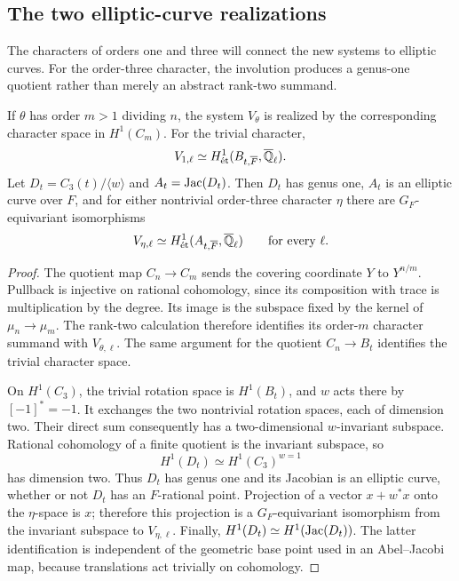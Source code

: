 \subsection{The two elliptic-curve realizations}

The characters of orders one and three will connect the new systems
to elliptic curves.  For the order-three character, the involution
produces a genus-one quotient rather than merely an abstract
rank-two summand.

\begin{proposition}\label{sys:elliptic}
If $\theta$ has order $m>1$ dividing $n$, the system $V_\theta$ is
realized by the corresponding character space in $H^1(C_m)$.
For the trivial character,
\[
 V_{1,\ell}\simeq H^1_{\mathrm{\acute et}}
                  (B_{t,\overline F},\overline{\mathbb Q}_\ell).
\]
Let $D_t=C_3(t)/\langle w\rangle$ and $A_t=\operatorname{Jac}(D_t)$.  Then $D_t$
has genus one, $A_t$ is an elliptic curve over $F$, and for either
nontrivial order-three character $\eta$ there are $G_F$-equivariant
isomorphisms
\[
 V_{\eta,\ell}\simeq
 H^1_{\mathrm{\acute et}}(A_{t,\overline F},\overline{\mathbb Q}_\ell)
 \qquad\text{for every }\ell.
\]
\end{proposition}

\begin{proof}
The quotient map $C_n\to C_m$ sends the covering coordinate $Y$ to
$Y^{n/m}$.  Pullback is injective on rational cohomology, since its
composition with trace is multiplication by the degree.  Its image
is the subspace fixed by the kernel of $\mu_n\to\mu_m$.
The rank-two calculation therefore identifies its order-$m$
character summand with $V_{\theta,\ell}$.  The same argument for the
quotient $C_n\to B_t$ identifies the trivial character space.

On $H^1(C_3)$, the trivial rotation space is $H^1(B_t)$, and $w$
acts there by $[-1]^*=-1$.  It exchanges the two nontrivial rotation
spaces, each of dimension two.  Their direct sum consequently has
a two-dimensional $w$-invariant subspace.  Rational cohomology of a
finite quotient is the invariant subspace, so
\[
 H^1(D_t)\simeq H^1(C_3)^{w=1}
\]
has dimension two.  Thus $D_t$ has genus one and its Jacobian is an
elliptic curve, whether or not $D_t$ has an $F$-rational point.
Projection of a vector $x+w^*x$ onto the $\eta$-space is $x$;
therefore this projection is a $G_F$-equivariant isomorphism from
the invariant subspace to $V_{\eta,\ell}$.  Finally,
$H^1(D_t)\simeq H^1(\operatorname{Jac}(D_t))$.  The latter identification is
independent of the geometric base point used in an Abel--Jacobi
map, because translations act trivially on cohomology.
\end{proof}

